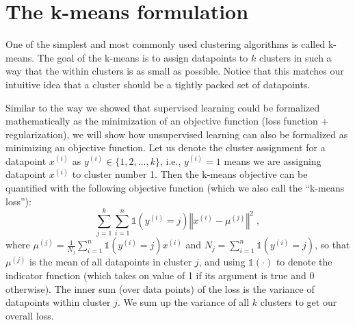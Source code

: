 \section{The k-means formulation}




One of the simplest and most commonly used clustering algorithms is
called k-means. The goal of the k-means is to assign
datapoints to $k$ clusters in such a way that
the within clusters is as small as
possible. Notice that this matches our intuitive idea that a cluster
should be a tightly packed set of datapoints.

Similar to the way we showed that supervised learning could be
formalized mathematically as the minimization of an objective function
(loss function + regularization), we will show how unsupervised
learning can also be formalized as minimizing an objective function.
Let us denote the cluster assignment for a datapoint $x^{(i)}$ as
$y^{(i)} \in \{1,2,\ldots,k\}$, i.e., $y^{(i)} = 1$ means we are
assigning datapoint $x^{(i)}$ to cluster number 1. Then the k-means
objective can be quantified with the following objective function
(which we also call the ``k-means loss''):
\begin{equation}
  \sum_{j=1}^k \sum_{i=1}^n \mathbb{1}(y^{(i)} = j) \left\Vert x^{(i)} - \mu^{(j)} \right\Vert^2 \label{eqn:kmeans_obj} \;,
\end{equation}
where $\mu^{(j)} = \frac{1}{N_j} \sum_{i=1}^n \mathbb{1}(y^{(i)} = j) x^{(i)}$
and $N_j = \sum_{i=1}^n \mathbb{1}(y^{(i)} = j)$, so that $\mu^{(j)}$ is the
mean of all datapoints in cluster $j$, and using $\mathbb{1}(\cdot)$
to denote the indicator function (which takes on value of 1 if its argument
is true and 0 otherwise). The inner sum (over data points) of the loss is
the variance of datapoints within cluster $j$. We sum up the variance
of all $k$ clusters to get our overall loss.


